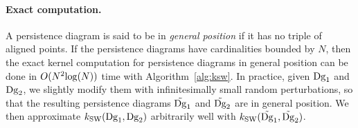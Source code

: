 \paragraph*{Exact computation.} A persistence diagram is said to be in {\em general position} if it has no triple of aligned points.  
If the persistence diagrams have cardinalities bounded by $N$, then the exact kernel computation for persistence diagrams in general 
position can be done in $O(N^2{\rm log}(N))$ time with 
Algorithm~\ref{alg:ksw}. In practice, given $\mathrm{Dg}_1$ and $\mathrm{Dg}_2$, we slightly modify them with infinitesimally small random perturbations, so that
the resulting persistence diagrams 
$\tilde{\mathrm{Dg}}_1$ and $\tilde{\mathrm{Dg}}_2$ are in general position. We then approximate 
$k_{\rm SW}(\mathrm{Dg}_1,\mathrm{Dg}_2)$ arbitrarily well with $k_{\rm SW}(\tilde{\mathrm{Dg}}_1,\tilde{\mathrm{Dg}}_2)$.	

